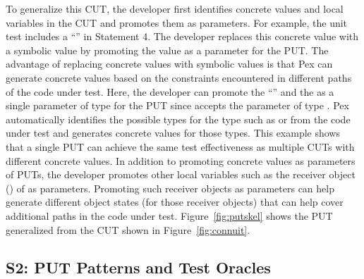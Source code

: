 To generalize this CUT, the developer first identifies concrete values and local variables in the CUT and promotes them as parameters. For example, the unit test includes a  ``'' in Statement 4. The developer replaces this concrete value with a symbolic value by promoting the value as a parameter for the PUT. The advantage of replacing concrete values with symbolic values is that Pex can generate concrete values based on the constraints encountered in different paths of the code under test. Here, the developer can promote the  ``'' and the   as a single parameter of type  for the PUT since  accepts the parameter of type . Pex automatically identifies the possible types for the  type such as  or  from the code under test and generates concrete values for those types. This example shows that a single PUT can achieve the same test effectiveness as multiple CUTs with different concrete values. In addition to promoting concrete values as parameters of PUTs, the developer promotes other local variables such as the receiver object () of  as parameters. Promoting such receiver objects as parameters can help generate different object states (for those receiver objects) that can help cover additional paths in the code under test. Figure~\ref{fig:putskel} shows the PUT generalized from the CUT shown in Figure~\ref{fig:connuit}.
\subsection{S2: PUT Patterns and Test Oracles}

